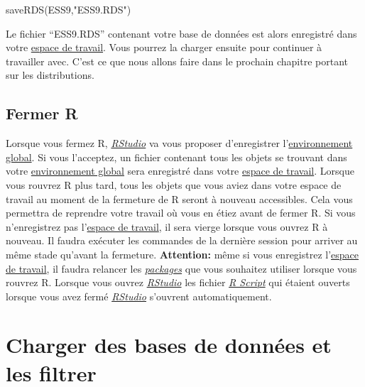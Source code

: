 \documentclass[
]{book}
\newenvironment{Shaded}{\begin{snugshade}}{\end{snugshade}}
\newcommand{\FunctionTok}[1]{\textcolor[rgb]{0.00,0.00,0.00}{#1}}
\newcommand{\NormalTok}[1]{#1}
\newcommand{\StringTok}[1]{\textcolor[rgb]{0.31,0.60,0.02}{#1}}
\begin{document}
\begin{Shaded}
\begin{Highlighting}[]
\FunctionTok{saveRDS}\NormalTok{(ESS9,}\StringTok{"ESS9.RDS"}\NormalTok{)}
\end{Highlighting}
\end{Shaded}

Le fichier ``ESS9.RDS'' contenant votre base de données est alors enregistré dans votre \protect\hyperlink{working_directory}{espace de travail}. Vous pourrez la charger ensuite pour continuer à travailler avec. C'est ce que nous allons faire dans le prochain chapitre portant sur les distributions.

\hypertarget{close_R}{%
\section{Fermer R}\label{close_R}}

Lorsque vous fermez R, \href{https://posit.co/}{\emph{RStudio}} va vous proposer d'enregistrer l'\protect\hyperlink{objets_envir}{environnement global}. Si vous l'acceptez, un fichier contenant tous les objets se trouvant dans votre \protect\hyperlink{objets_envir}{environnement global} sera enregistré dans votre \protect\hyperlink{working_directory}{espace de travail}. Lorsque vous rouvrez R plus tard, tous les objets que vous aviez dans votre espace de travail au moment de la fermeture de R seront à nouveau accessibles. Cela vous permettra de reprendre votre travail où vous en étiez avant de fermer R. Si vous n'enregistrez pas l'\protect\hyperlink{working_directory}{espace de travail}, il sera vierge lorsque vous ouvrez R à nouveau. Il faudra exécuter les commandes de la dernière session pour arriver au même stade qu'avant la fermeture. \textbf{Attention:} même si vous enregistrez l'\protect\hyperlink{working_directory}{espace de travail}, il faudra relancer les \protect\hyperlink{packages}{\emph{packages}} que vous souhaitez utiliser lorsque vous rouvrez R. Lorsque vous ouvrez \href{https://posit.co/}{\emph{RStudio}} les fichier \protect\hyperlink{Commandes}{\emph{R Script}} qui étaient ouverts lorsque vous avez fermé \href{https://posit.co/}{\emph{RStudio}} s'ouvrent automatiquement.

\hypertarget{charge_code_filtrer}{%
\chapter{Charger des bases de données et les filtrer}\label{charge_code_filtrer}}
\end{document}

